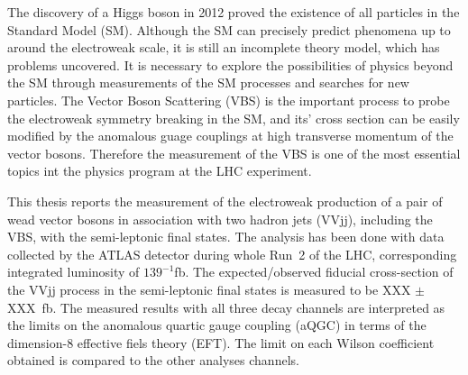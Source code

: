 The discovery of a Higgs boson in 2012 proved the existence of all particles in the Standard Model (SM). 
Although the SM can precisely predict phenomena up to around the electroweak scale, it is still an incomplete theory model, which has problems uncovered. 
It is necessary to explore the possibilities of physics beyond the SM through measurements of the SM processes and searches for new particles. 
The Vector Boson Scattering (VBS) is the important process to probe the electroweak symmetry breaking in the SM, and its’ cross section can be easily modified by the anomalous guage couplings at high transverse momentum of the vector bosons. Therefore the measurement of the VBS is one of the most essential topics int the physics program at the LHC experiment.

This thesis reports the measurement of the electroweak production of a pair of wead vector bosons in association with two hadron jets (VVjj), including the VBS, with the semi-leptonic final states.
The analysis has been done with data collected by the ATLAS detector during whole Run~2 of the LHC, corresponding integrated luminosity of $139^{-1}$fb.
The expected/observed fiducial cross-section of the VVjj process in the semi-leptonic final states is measured to be XXX $\pm$ XXX~fb. The measured results with all three decay channels are interpreted as the limits on the anomalous quartic gauge coupling (aQGC) in terms of the dimension-8 effective fiels theory (EFT).
The limit on each Wilson coefficient obtained is compared to the other analyses channels.

